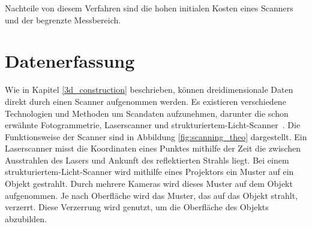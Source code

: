 Nachteile von diesem Verfahren sind die hohen initialen Kosten eines Scanners 
und der begrenzte Messbereich. 

\section{Datenerfassung} \label{lasers}

Wie in Kapitel \ref{3d_construction} beschrieben, 
können dreidimensionale Daten direkt durch einen Scanner aufgenommen werden. 
Es existieren verschiedene Technologien und Methoden um Scandaten aufzunehmen, 
darunter die schon erwähnte Fotogrammetrie, Laserscanner und 
strukturiertem-Licht-Scanner~\cite{Ruiz.2022}. 
Die Funktionsweise der Scanner sind in Abbildung \ref{fig:scanning_theo} dargestellt.
Ein Laserscanner misst die Koordinaten eines Punktes mithilfe der Zeit die zwischen 
Ausstrahlen des Lasers und Ankunft des reflektierten Strahls liegt.
Bei einem strukturiertem-Licht-Scanner wird mithilfe eines Projektors ein Muster 
auf ein Objekt gestrahlt. Durch mehrere Kameras wird dieses Muster auf dem Objekt 
aufgenommen. Je nach Oberfläche wird das Muster, das auf das Objekt strahlt, verzerrt.
Diese Verzerrung wird genutzt, um die Oberfläche des Objekts 
abzubilden.~\cite{georgopoulos2010assessing}

